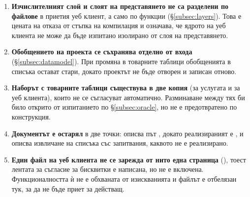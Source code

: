 \begin{enumerate}[topsep=2pt,itemsep=2pt,leftmargin=*]
\item \textbf{Изчислителният слой и слоят на представянето не са разделени по файлове}
      в приетия уеб клиент, а само по функции (§\ref{subsec:layers}). Това е цената на
      отказа от стъпка на компилация и означава, че ядрото на уеб клиента не може да
      бъде изпитано изолирано от слоя на представянето.
\item \textbf{Обобщението на проекта се съхранява отделно от входа}
      (§\ref{subsec:datamodel}). При промяна в товарните таблици обобщенията в списъка
      остават стари, докато проектът не бъде отворен и записан отново.
\item \textbf{Наборът с товарните таблици съществува в две копия} (за услугата и за
      уеб клиента), които не се съгласуват автоматично. Разминаване между тях би било
      открито от изпитанието по §\ref{subsec:oracle}, но не е предотвратено по
      конструкция.
\item \textbf{Документът  е остарял} в две точки: описва път
      , докато реализираният е
      , и описва извличане на списъка със
      запитвания, каквото не е реализирано.
\item \textbf{Един файл на уеб клиента не се зарежда от нито една страница}
      (), тоест лентата за съгласие за бисквитки е написана,
      но не е включена. Функционалността ѝ не е обхваната от изискванията и файлът е
      отбелязан тук, за да не бъде приет за действащ.
\end{enumerate}
